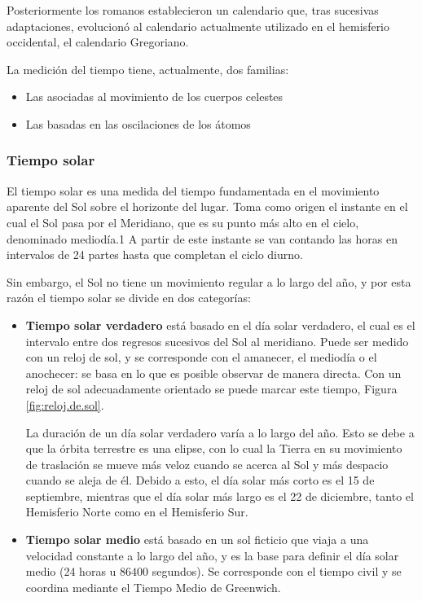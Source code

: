 Posteriormente los romanos establecieron un calendario que, tras sucesivas adaptaciones, evolucion\'o al calendario actualmente utilizado en el hemisferio occidental, el calendario Gregoriano.

La medici\'on del tiempo tiene, actualmente, dos familias:
\begin{itemize}
\item Las asociadas al movimiento de los cuerpos celestes
\item Las basadas en las oscilaciones de los \'atomos
\end{itemize}

\subsubsection{Tiempo solar}
\label{sec:tiempo.solar}

El tiempo solar es una medida del tiempo fundamentada en el movimiento aparente del Sol sobre el horizonte del lugar. Toma como origen el instante en el cual el Sol pasa por el Meridiano, que es su punto más alto en el cielo, denominado mediodía.1 A partir de este instante se van contando las horas en intervalos de 24 partes hasta que completan el ciclo diurno.

Sin embargo, el Sol no tiene un movimiento regular a lo largo del año, y por esta razón el tiempo solar se divide en dos categorías:

\begin{itemize}
\item {\bf Tiempo solar verdadero} está basado en el día solar verdadero,
  el cual es el intervalo entre dos regresos sucesivos del Sol al
  meridiano. Puede ser medido con un reloj de sol, y se corresponde
  con el amanecer, el mediodía o el anochecer: se basa en lo que es
  posible observar de manera directa. Con un reloj de sol adecuadamente orientado se puede marcar este tiempo, Figura \ref{fig:reloj.de.sol}.

La duración de un día solar verdadero varía a lo largo del año. Esto se debe a que la órbita terrestre es una elipse, con lo cual la Tierra en su movimiento de traslación se mueve más veloz cuando se acerca al Sol y más despacio cuando se aleja de él. Debido a esto, el día solar más corto es el 15 de septiembre, mientras que el día solar más largo es el 22 de diciembre, tanto el Hemisferio Norte como en el Hemisferio Sur.


\item \textbf{ Tiempo solar medio} está basado en un sol ficticio que viaja a una   velocidad constante a lo largo del año, y es la base para definir el
  día solar medio (24 horas u $86400$ segundos). Se corresponde con el
  tiempo civil y se coordina mediante el Tiempo Medio de Greenwich.
\end{itemize}


